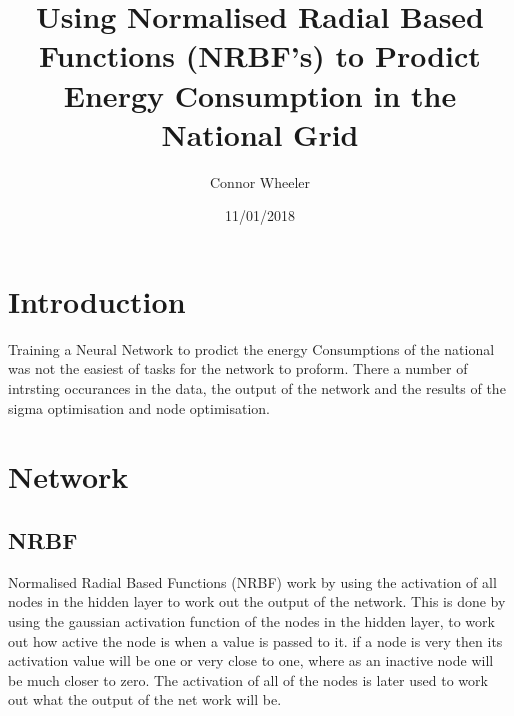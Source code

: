 \documentclass{IEEEtran}
\title{Using Normalised Radial Based Functions (NRBF's) to Prodict Energy Consumption in the National Grid}
\author{Connor Wheeler}
\date{11/01/2018}
\begin{document}

\maketitle

\newpage
\section{Introduction}
\begin{flushleft}
    Training a Neural Network to prodict the energy Consumptions of the national was not the easiest of tasks
    for the network to proform. There a number of intrsting occurances in the data, the output of the network and
    the results of the sigma optimisation and node optimisation.
\end{flushleft}
\section{Network}
\subsection{NRBF}
\begin{flushleft}
  Normalised Radial Based Functions (NRBF) work by using the activation of all nodes in the hidden
  layer to work out the output of the network. This is done by using the gaussian activation function
  of the nodes in the hidden layer, to work out how active the node is when a value is passed to it.
  if a node is very then its activation value will be one or very close to one, where as an inactive
  node will be much closer to zero. The activation of all of the nodes is later used to work out what
  the output of the net work will be.
\end{flushleft}
\end{document}
